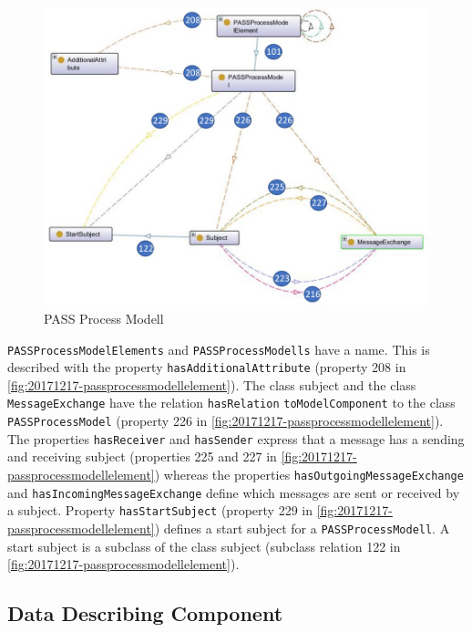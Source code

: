 \begin{figure}[htbp]
	\centering
	\includegraphics[width=1.0\linewidth]{20181026-Ontologie-Bilder/Grafiken-Ontologie/SUbject-Interaction/20181217-PASSProcessModel}
	\caption[PASS Process Modell]{PASS Process Modell}
	\label{fig:20181217-passprocessmodel}
\end{figure}

\texttt{PASSProcessModelElements} and \texttt{PASSProcessModells} have a name. This is described with the property \texttt{hasAdditionalAttribute} (property 208 in \ref{fig:20171217-passprocessmodellelement}). The class subject and the class \texttt{MessageExchange} have the relation \texttt{hasRelation} \texttt{toModelComponent} to the class \texttt{PASSProcessModel} (property 226 in \ref{fig:20171217-passprocessmodellelement}). The properties \texttt{hasReceiver} and \texttt{hasSender} express that a message has a sending and receiving subject (properties 225 and 227 in \ref{fig:20171217-passprocessmodellelement}) whereas the properties \texttt{hasOutgoingMessageExchange} and \texttt{hasIncomingMessageExchange} define which messages are sent or received by a subject. Property \texttt{hasStartSubject} (property 229 in \ref{fig:20171217-passprocessmodellelement}) defines a start subject for a \texttt{PASSProcessModell}. A start subject is a subclass of the class subject (subclass relation 122 in \ref{fig:20171217-passprocessmodellelement}).

\subsection{Data Describing Component}

